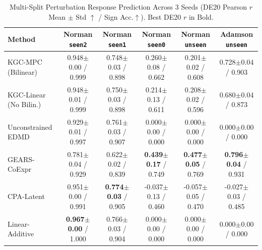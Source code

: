 \begin{table}[t]
\centering
\caption{Multi-Split Perturbation Response Prediction Across 3 Seeds (DE20 Pearson $r$ Mean $\pm$ Std $\uparrow$ / Sign Acc.$\uparrow$). Best DE20 $r$ in Bold.}
\label{tab:genetic_pert}
\scriptsize
\setlength{\tabcolsep}{2.6pt}
\begin{tabular}{lccccc}
\toprule
Method & Norman \texttt{seen2} & Norman \texttt{seen1} & Norman \texttt{seen0} & Norman \texttt{unseen} & Adamson \texttt{unseen} \\
\midrule
KGC-MPC (Bilinear) & 0.948$\pm$0.00 / 0.999 & 0.748$\pm$0.03 / 0.898 & 0.260$\pm$0.08 / 0.662 & 0.201$\pm$0.02 / 0.608 & 0.728$\pm$0.04 / 0.903 \\
KGC-Linear (No Bilin.) & 0.948$\pm$0.01 / 0.999 & 0.750$\pm$0.03 / 0.898 & 0.214$\pm$0.13 / 0.611 & 0.208$\pm$0.02 / 0.596 & 0.680$\pm$0.04 / 0.873 \\
Unconstrained EDMD & 0.929$\pm$0.01 / 0.997 & 0.761$\pm$0.03 / 0.907 & 0.000$\pm$0.00 / 0.000 & 0.000$\pm$0.00 / 0.000 & 0.000$\pm$0.00 / 0.000 \\
GEARS-CoExpr & 0.781$\pm$0.04 / 0.929 & 0.622$\pm$0.02 / 0.839 & \textbf{0.439$\pm$0.17} / 0.749 & \textbf{0.477$\pm$0.05} / 0.769 & \textbf{0.796$\pm$0.04} / 0.931 \\
CPA-Latent & 0.951$\pm$0.00 / 0.991 & \textbf{0.774$\pm$0.03} / 0.905 & -0.037$\pm$0.13 / 0.460 & -0.057$\pm$0.05 / 0.470 & -0.027$\pm$0.03 / 0.485 \\
Linear-Additive & \textbf{0.967$\pm$0.00} / 1.000 & 0.766$\pm$0.03 / 0.904 & 0.000$\pm$0.00 / 0.000 & 0.000$\pm$0.00 / 0.000 & 0.000$\pm$0.00 / 0.000 \\
\bottomrule
\end{tabular}
\end{table}
